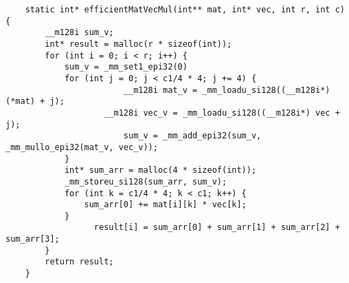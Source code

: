 \begin{solution} [0.5in]
\begin{verbatim}
    static int* efficientMatVecMul(int** mat, int* vec, int r, int c) {
        __m128i sum_v;
        int* result = malloc(r * sizeof(int));
        for (int i = 0; i < r; i++) {
            sum_v = _mm_set1_epi32(0)	
            for (int j = 0; j < c1/4 * 4; j += 4) {
                        __m128i mat_v = _mm_loadu_si128((__m128i*) (*mat) + j);
                    __m128i vec_v = _mm_loadu_si128((__m128i*) vec + j);
                        sum_v = _mm_add_epi32(sum_v, _mm_mullo_epi32(mat_v, vec_v));
            }
            int* sum_arr = malloc(4 * sizeof(int));
            _mm_storeu_si128(sum_arr, sum_v);
            for (int k = c1/4 * 4; k < c1; k++) { 
                sum_arr[0] += mat[i][k] * vec[k]; 
            }
                  result[i] = sum_arr[0] + sum_arr[1] + sum_arr[2] + sum_arr[3];
        }
        return result;
    }
\end{verbatim}
\end{solution}


    
